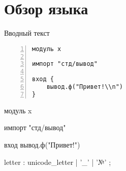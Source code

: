 \hypertarget{review}{%
\section{Обзор языка}\label{review:chapter}}


Вводный текст

\begin{Verbatim}[frame=single,numbers=left]
модуль x

импорт "стд/вывод"

вход { 
    вывод.ф("Привет!\\n")
}
\end{Verbatim}

\begin{Trivil}
модуль x

импорт "стд/вывод"

вход { 
    вывод.ф("Привет!\n")
}
\end{Trivil}

\begin{Grammar}
letter
    : unicode_letter
    | '_'
    | '№'
    ;
\end{Grammar}